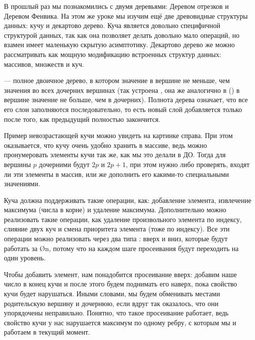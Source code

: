 В прошлый раз мы познакомились с двумя деревьями: Деревом отрезков и Деревом Фенвика. На этом же уроке мы изучим ещё две древовидные структуры данных: кучу и декартово дерево. Куча является довольно специфичной структурой данных, так как она позволяет делать довольно мало операций, но взамен имеет маленькую скрытую асимптотику. Декартово дерево же можно рассматривать как мощную модификацию встроенных структур данных: массивов, множеств и куч.


 — полное двоичное дерево, в котором значение в вершине не меньше, чем значения во всех дочерних вершинах (так устроена , она же  аналогично в  () в вершине значение не больше, чем в дочерних). Полнота дерева означает, что все его слои заполняются последовательно, то есть новый слой добавляется только после того, как предыдущий полностью закончится.

\begin{wrapping}{0.34}
	Пример невозрастающей кучи можно увидеть на картинке справа. При этом оказывается, что кучу очень удобно хранить в массиве, ведь можно пронумеровать элементы кучи так же, как мы это делали в ДО. Тогда для вершины $p$ дочерними будут $2p$ и $2p + 1$, при этом нужно либо проверять, входят ли эти элементы в массив, или же дополнить его какими-то специальными значениями.
\end{wrapping}

Куча должна поддерживать такие операции, как: добавление элемента, извлечение максимума (числа в корне) и удаление максимума. Дополнительно можно реализовать такие операции, как удаление произвольного элемента по индексу, слияние двух куч и смена приоритета элемента (тоже по индексу). Все эти операции можно реализовать через два типа : вверх и вниз, которые будут работать за \O{\log n}, потому что на каждом шаге просеивания будут переходить на один уровень.

Чтобы добавить элемент, нам понадобится просеивание вверх: добавим наше число в конец кучи и после этого будем поднимать его наверх, пока свойство кучи будет нарушаться. Иными словами, мы будем обменивать местами родительскую вершину и дочернюю, если вдруг так оказалось, что они упорядочены неправильно. Понятно, что такое просеивание работает, ведь свойство кучи у нас нарушается максимум по одному ребру, с которым мы и работаем в текущий момент.

